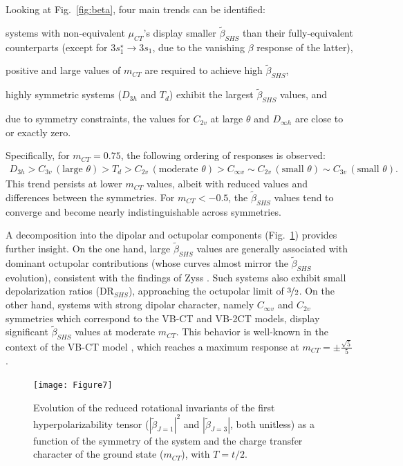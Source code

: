 \documentclass[USenglish]{article}
\begin{document}
Looking at Fig.~\ref{fig:beta}, four main trends can be identified: \begin{inparaenum}[(i)]
	\item systems with non-equivalent $\mu_{CT}$'s display smaller $\tilde\beta_{SHS}$ than their fully-equivalent counterparts (except for $3s_1^\star \rightarrow 3s_1$, due to the vanishing $\beta$ response of the latter),
	\item positive and large values of $m_{CT}$ are required to achieve high $\tilde\beta_{SHS}$,
	\item highly symmetric systems ($D_{3h}$ and $T_d$) exhibit the largest $\tilde\beta_{SHS}$ values, and
	\item due to symmetry constraints, the values for $C_{2v}$ at large $\theta$ and $D_{\infty h}$ are close to or exactly zero.
\end{inparaenum}
Specifically, for $m_{CT} = 0.75$, the following ordering of responses is observed:
\begin{align}
	D_{3h} > C_{3v}\,(\text{large } \theta) > T_d > C_{2v}\,(\text{moderate } \theta) > C_{\infty v} \sim C_{2v}\,(\text{small } \theta) \sim C_{3v}\,(\text{small } \theta). \label{eq:ordering}
\end{align}
This trend persists at lower $m_{CT}$ values, albeit with reduced values and differences between the symmetries. For $m_{CT} < -0.5$, the $\tilde\beta_{SHS}$ values tend to converge and become nearly indistinguishable across symmetries.

\clearpage

A decomposition into the dipolar and octupolar components (Fig.~\ref{fig:betaJ}) provides further insight. On the one hand, large $\tilde\beta_{SHS}$ values are generally associated with dominant octupolar contributions (whose curves almost mirror the $\tilde\beta_{SHS}$ evolution), consistent with the findings of Zyss \cite{zyssMolecularEngineeringImplications1993}. Such systems also exhibit small depolarization ratios (DR$_{SHS}$), approaching the octupolar limit of $\nicefrac{3}{2}$. On the other hand, systems with strong dipolar character, namely $C_{\infty v}$ and $C_{2v}$ symmetries which correspond to the VB-CT and VB-2CT models, display significant $\tilde\beta_{SHS}$ values at moderate $m_{CT}$. This behavior is well-known in the context of the VB-CT model \cite{barzoukasTwostateDescriptionHyper1996}, which reaches a maximum response at $m_{CT} = \pm\frac{\sqrt{5}}{5}$.

\begin{figure}[!h]
\texttt{[image: Figure7]}
\caption{Evolution of the reduced rotational invariants of the first hyperpolarizability tensor ($|\tilde \beta_{J=1}|^2$ and $|\tilde \beta_{J=3}|$, both unitless) as a function of the symmetry of the system and the charge transfer character of the ground state ($m_{CT}$), with $T=t/2$.}
\label{fig:betaJ}
\end{figure}
\end{document}
